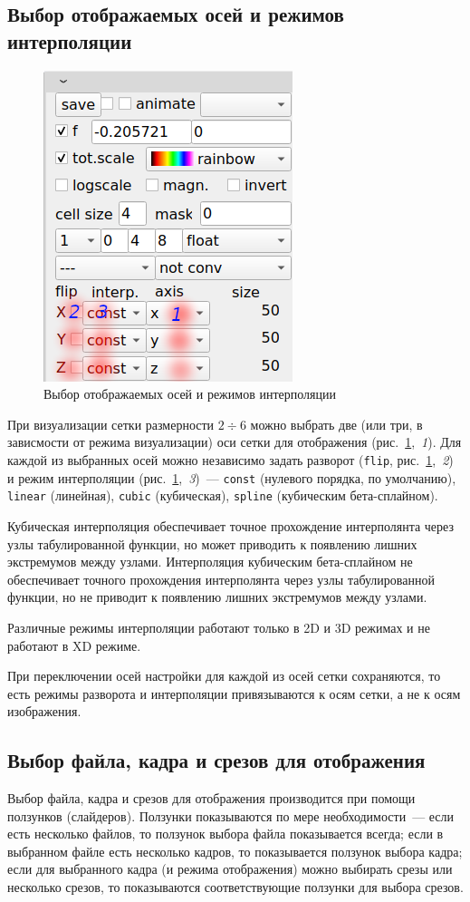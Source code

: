 \documentclass[12pt]{article}
\begin{document}

\subsection{Выбор отображаемых осей и режимов интерполяции}
\begin{figure}
  \includegraphics[width=.28\textwidth]{picts/sel-axis.png} 
  \caption{Выбор отображаемых осей и режимов интерполяции}\label{sel:axis:pict}
\end{figure}
При визуализации сетки размерности $2\div6$ можно выбрать две (или три, в зависмости от режима визуализации)
оси сетки для отображения (рис.~\ref{sel:axis:pict},~{\it 1}). Для каждой из выбранных осей можно независимо задать разворот
(\verb'flip', рис.~\ref{sel:axis:pict},~{\it 2})
и режим интерполяции (рис.~\ref{sel:axis:pict},~{\it 3})~--- \verb'const' (нулевого порядка, по умолчанию),
\verb'linear' (линейная), \verb'cubic' (кубическая), \verb'spline' (кубическим бета-сплайном). 

Кубическая интерполяция обеспечивает точное прохождение интерполянта через узлы табулированной функции, но может приводить к появлению лишних экстремумов между узлами.
Интерполяция кубическим бета-сплайном не обеспечивает точного прохождения интерполянта через узлы табулированной функции,
но не приводит к появлению лишних экстремумов между узлами.

Различные режимы интерполяции работают только в 2D и 3D режимах и не работают в XD режиме.

При переключении осей настройки для каждой из осей сетки сохраняются, то есть режимы разворота и интерполяции привязываются к осям сетки, а не к осям изображения.

\subsection{Выбор файла, кадра и срезов для отображения}
Выбор файла, кадра и срезов для отображения производится при помощи ползунков (слайдеров).
Ползунки показываются по мере необходимости~--- если есть несколько файлов, то ползунок выбора файла показывается всегда;
если в выбранном файле есть несколько кадров, то показывается ползунок выбора кадра;
если для выбранного кадра (и режима отображения) можно выбирать срезы или несколько срезов, то показываются
соответствующие ползунки для выбора срезов.
\end{document}
